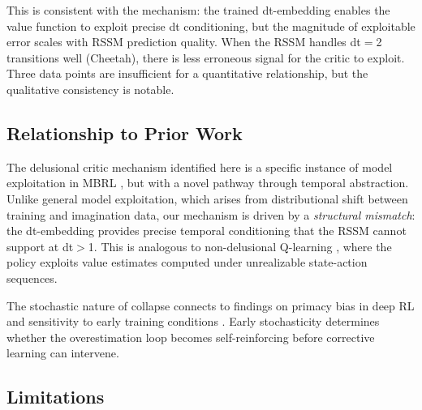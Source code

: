 \documentclass[letterpaper]{article}
\begin{document}
This is consistent with the mechanism: the trained dt-embedding enables the value function to exploit precise dt conditioning, but the magnitude of exploitable error scales with RSSM prediction quality.
When the RSSM handles dt$=$2 transitions well (Cheetah), there is less erroneous signal for the critic to exploit.
Three data points are insufficient for a quantitative relationship, but the qualitative consistency is notable.

\subsection{Relationship to Prior Work}

The delusional critic mechanism identified here is a specific instance of model exploitation in MBRL \citep{janner2019trust}, but with a novel pathway through temporal abstraction.
Unlike general model exploitation, which arises from distributional shift between training and imagination data, our mechanism is driven by a \emph{structural mismatch}: the dt-embedding provides precise temporal conditioning that the RSSM cannot support at dt$>$1.
This is analogous to non-delusional Q-learning \citep{lu2018non}, where the policy exploits value estimates computed under unrealizable state-action sequences.

The stochastic nature of collapse connects to findings on primacy bias in deep RL \citep{nikishin2022primacy} and sensitivity to early training conditions \citep{henderson2018deep,bjorck2022high}.
Early stochasticity determines whether the overestimation loop becomes self-reinforcing before corrective learning can intervene.

\subsection{Limitations}
\end{document}
